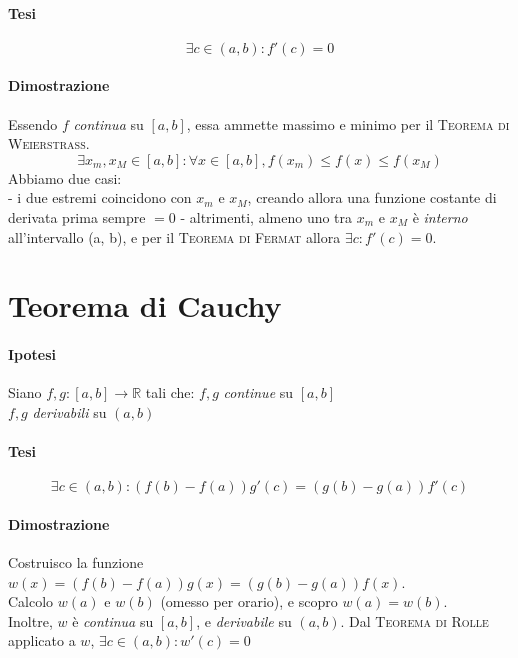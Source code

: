 \documentclass{article}
\begin{document}
\paragraph{Tesi}
\[\exists c \in (a, b) : f'(c) = 0\]

\paragraph{Dimostrazione}
Essendo \(f\) \textit{continua} su \([a, b]\), essa ammette massimo e minimo per il \textsc{Teorema di Weierstrass}.
\[\exists x_m, x_M \in [a, b] : \forall x \in [a, b], f(x_m) \leq f(x) \leq f(x_M)\]
Abbiamo due casi:\\
- i due estremi coincidono con \(x_m\) e \(x_M\), creando allora una funzione costante di derivata prima sempre \(= 0\)
- altrimenti, almeno uno tra \(x_m\) e \(x_M\) è \textit{interno} all'intervallo (a, b), e per il \textsc{Teorema di Fermat} allora \(\exists c : f'(c) = 0\).

\section{Teorema di Cauchy}
\paragraph{Ipotesi}
Siano \(f, g : [a, b] \to \mathbb{R}\) tali che:
\(f, g\) \textit{continue} su \([a, b]\)\\
\(f, g\) \textit{derivabili} su \((a, b)\)

\paragraph{Tesi}
\[\exists c \in (a, b) : (f(b) - f(a)) g'(c) = (g(b) - g(a)) f'(c)\]

\paragraph{Dimostrazione}
Costruisco la funzione \(w(x) = (f(b) - f(a)) g(x) = (g(b) - g(a)) f(x)\).\\
Calcolo \(w(a)\) e \(w(b)\) (omesso per orario), e scopro \(w(a) = w(b)\).\\
Inoltre, \(w\) è \textit{continua} su \([a, b]\), e \textit{derivabile} su \((a, b)\).
Dal \textsc{Teorema di Rolle} applicato a \(w\), \(\exists c \in (a, b) : w'(c) = 0\)
\end{document}
